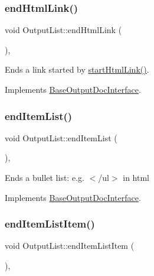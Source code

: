 \subsubsection{\texorpdfstring{endHtmlLink()}{endHtmlLink()}}
{\footnotesize\ttfamily void Output\+List\+::end\+Html\+Link (\begin{DoxyParamCaption}{ }\end{DoxyParamCaption})\hspace{0.3cm}{\ttfamily [inline]}, {\ttfamily [virtual]}}

Ends a link started by \mbox{\hyperlink{class_output_list_acfe3869e533af42c1446e2fc91a37e5e}{start\+Html\+Link()}}. 

Implements \mbox{\hyperlink{class_base_output_doc_interface_afb808c1c487135d4fb2156d0675b387e}{Base\+Output\+Doc\+Interface}}.

\mbox{\label{class_output_list_ac6efca5985597bb6e51427c51d40732f}} 
\subsubsection{\texorpdfstring{endItemList()}{endItemList()}}
{\footnotesize\ttfamily void Output\+List\+::end\+Item\+List (\begin{DoxyParamCaption}{ }\end{DoxyParamCaption})\hspace{0.3cm}{\ttfamily [inline]}, {\ttfamily [virtual]}}

Ends a bullet list\+: e.\+g. {\ttfamily $<$/ul$>$} in html 

Implements \mbox{\hyperlink{class_base_output_doc_interface_a3493b65672bf134033bd3bb296acdff4}{Base\+Output\+Doc\+Interface}}.

\mbox{\label{class_output_list_a784d921c1961db570e1b12905fe97c05}} 
\subsubsection{\texorpdfstring{endItemListItem()}{endItemListItem()}}
{\footnotesize\ttfamily void Output\+List\+::end\+Item\+List\+Item (\begin{DoxyParamCaption}{ }\end{DoxyParamCaption})\hspace{0.3cm}{\ttfamily [inline]}, {\ttfamily [virtual]}}

